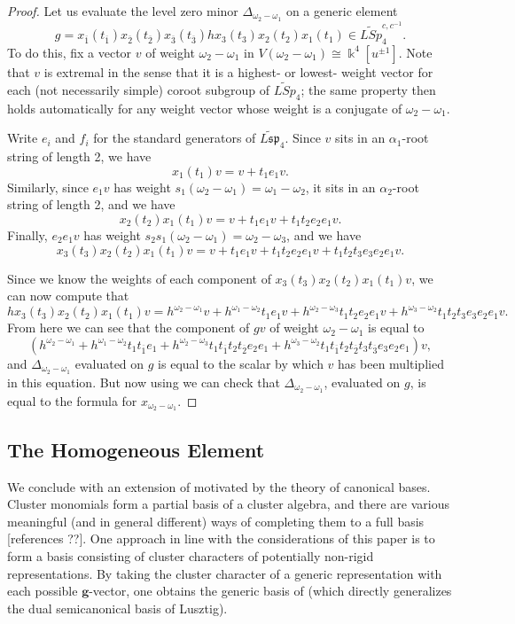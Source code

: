 \documentclass[12pt]{amsart}
\newcommand{\saySS}[1]{\say[SS]{\color{blue}{\bf SS:}\;#1}}
\newcommand{\kk}{\Bbbk}
\newcommand{\bfg}{\mathbf{g}}
\newcommand{\ol}[1]{\overline{#1}}
\newcommand{\loopvar}{u}
\theoremstyle{remark}
\numberwithin{equation}{section}
\numberwithin{figure}{section}
\begin{document}
\begin{proof}
  Let us evaluate the level zero minor $\Delta_{\omega_2 - \omega_1}$ on a generic element
  \[
    g = x_{\ol{1}}(t_{\ol{1}})x_{\ol{2}}(t_{\ol{2}})x_{\ol{3}}(t_{\ol{3}})hx_3(t_3)x_2(t_2)x_1(t_1) \in \widetilde{LSp}_4^{c,c^{-1}}.
  \]
  To do this, fix a vector $v$ of weight $\omega_2 - \omega_1$  in $V(\omega_2 - \omega_1) \cong \kk^4[\loopvar^{\pm 1}]$.
  Note that $v$ is extremal in the sense that it is a highest- or lowest- weight vector for each (not necessarily simple) coroot subgroup of $\widetilde{LSp}_4$; the same property then holds automatically for any weight vector whose weight is a conjugate of $\omega_2 - \omega_1$.

  Write $e_i$ and $f_i$ for the standard generators of $\widetilde{L\mathfrak{sp}}_4$.
  Since $v$ sits in an $\alpha_1$-root string of length 2, we have
  \[
    x_1(t_1)v = v + t_1e_1v.
  \]
  Similarly, since $e_1v$ has weight $s_1(\omega_2 - \omega_1) = \omega_1 - \omega_2$, it sits in an $\alpha_2$-root string of length 2, and we have
  \[
    x_2(t_2)x_1(t_1)v = v + t_1e_1v + t_1t_2e_2e_1v.
  \]
  Finally, $e_2e_1v$ has weight $s_2s_1(\omega_2 - \omega_1) = \omega_2 - \omega_3$, and we have
  \[
    x_3(t_3)x_2(t_2)x_1(t_1)v = v + t_1e_1v + t_1t_2e_2e_1v + t_1t_2t_3e_3e_2e_1v.
  \]

  Since we know the weights of each component of $x_3(t_3)x_2(t_2)x_1(t_1)v$, we can now compute that
  \[
    hx_3(t_3)x_2(t_2)x_1(t_1)v = h^{\omega_2-\omega_1}v + h^{\omega_1 - \omega_2}t_1e_1v + h^{\omega_2-\omega_3}t_1t_2e_2e_1v + h^{\omega_3-\omega_2}t_1t_2t_3e_3e_2e_1v.
  \]
  From here we can see that the component of $gv$ of weight $\omega_2 - \omega_1$ is equal to 
  \[
    (h^{\omega_2-\omega_1} + h^{\omega_1 - \omega_2}t_1t_{\ol{1}}e_1 + h^{\omega_2-\omega_3}t_1t_{\ol{1}}t_2t_{\ol{2}}e_2e_1 + h^{\omega_3-\omega_2}t_1t_{\ol{1}}t_2t_{\ol{2}}t_3t_{\ol{3}}e_3e_2e_1)v,
  \]
  and $\Delta_{\omega_2-\omega_1}$ evaluated on $g$ is equal to the scalar by which $v$ has been multiplied in this equation.
  But now using  we can check that $\Delta_{\omega_2-\omega_1}$, evaluated on $g$, is equal to the formula for $x_{\omega_2 - \omega_1}$.
\end{proof}

\subsection{The Homogeneous Element}
We conclude with an extension of  motivated by the theory of canonical bases.
Cluster monomials form a partial basis of a cluster algebra, and there are various meaningful (and in general different) ways of completing them to a full basis [references ??].
\saySS{Add references}
One approach in line with the considerations of this paper is to form a basis consisting of cluster characters of potentially non-rigid representations.
By taking the cluster character of a generic representation with each possible $\bfg$-vector, one obtains the generic basis of \cite{Dup12} (which directly generalizes the dual semicanonical basis of Lusztig).
\end{document}
